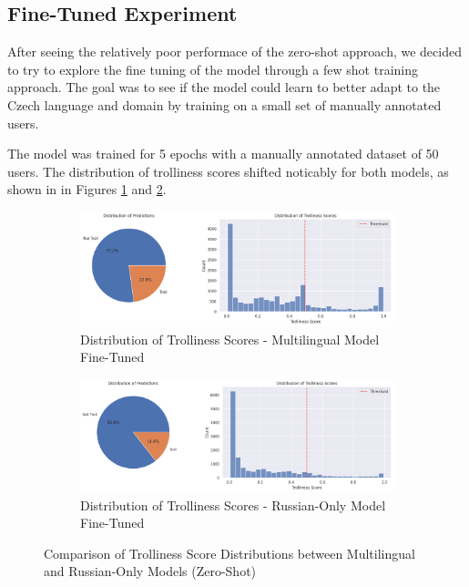 \documentclass[twoside]{ctuthesis}
\theoremstyle{plain}
\theoremstyle{definition}
\theoremstyle{note}
\begin{document}
\subsection{Fine-Tuned Experiment}
After seeing the relatively poor performace of the zero-shot approach, we decided to try to explore the fine tuning of the model through a few shot training approach. The goal was to see if the model could learn to better adapt to the Czech language and domain by training on a small set of manually annotated users.\par
The model was trained for 5 epochs with a manually annotated dataset of 50 users. The distribution of trolliness scores shifted noticably for both models, as shown in in Figures \ref{fig:distribution_multi_finetuned} and \ref{fig:russian_distribution_finetuned}.\par

\begin{figure}[h]
    \centering
    \begin{subfigure}{0.49\textwidth}
        \includegraphics[width=\linewidth]{figures/distribution_fine_tuned.png}
        \caption{Distribution of Trolliness Scores - Multilingual Model Fine-Tuned}
        \label{fig:distribution_multi_finetuned}
    \end{subfigure}
    \hfill
    \begin{subfigure}{0.49\textwidth}
        \includegraphics[width=\linewidth]{figures/distribution_ru_finetuned0.png}
        \caption{Distribution of Trolliness Scores - Russian-Only Model Fine-Tuned}
        \label{fig:russian_distribution_finetuned}
    \end{subfigure}
    \caption{Comparison of Trolliness Score Distributions between Multilingual and Russian-Only Models (Zero-Shot)}
    \label{fig:distribution_comparison_finetuned}
\end{figure}
\end{document}
